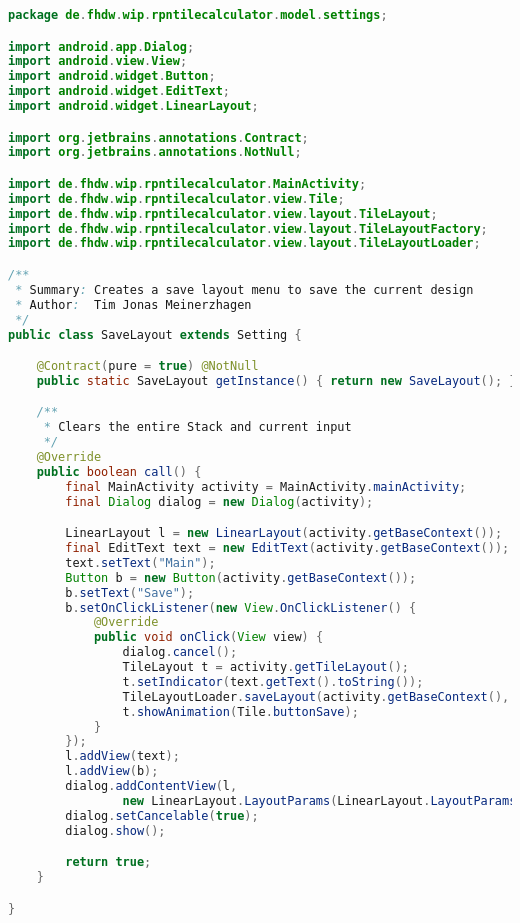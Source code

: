 \begin{lstlisting}[caption=SaveLayout (Meinerzhagen),label=list:SaveLayout,language=Java]
package de.fhdw.wip.rpntilecalculator.model.settings;

import android.app.Dialog;
import android.view.View;
import android.widget.Button;
import android.widget.EditText;
import android.widget.LinearLayout;

import org.jetbrains.annotations.Contract;
import org.jetbrains.annotations.NotNull;

import de.fhdw.wip.rpntilecalculator.MainActivity;
import de.fhdw.wip.rpntilecalculator.view.Tile;
import de.fhdw.wip.rpntilecalculator.view.layout.TileLayout;
import de.fhdw.wip.rpntilecalculator.view.layout.TileLayoutFactory;
import de.fhdw.wip.rpntilecalculator.view.layout.TileLayoutLoader;

/**
 * Summary: Creates a save layout menu to save the current design
 * Author:  Tim Jonas Meinerzhagen
 */
public class SaveLayout extends Setting {

    @Contract(pure = true) @NotNull
    public static SaveLayout getInstance() { return new SaveLayout(); }

    /**
     * Clears the entire Stack and current input
     */
    @Override
    public boolean call() {
        final MainActivity activity = MainActivity.mainActivity;
        final Dialog dialog = new Dialog(activity);

        LinearLayout l = new LinearLayout(activity.getBaseContext());
        final EditText text = new EditText(activity.getBaseContext());
        text.setText("Main");
        Button b = new Button(activity.getBaseContext());
        b.setText("Save");
        b.setOnClickListener(new View.OnClickListener() {
            @Override
            public void onClick(View view) {
                dialog.cancel();
                TileLayout t = activity.getTileLayout();
                t.setIndicator(text.getText().toString());
                TileLayoutLoader.saveLayout(activity.getBaseContext(), t);
                t.showAnimation(Tile.buttonSave);
            }
        });
        l.addView(text);
        l.addView(b);
        dialog.addContentView(l,
                new LinearLayout.LayoutParams(LinearLayout.LayoutParams.WRAP_CONTENT, LinearLayout.LayoutParams.WRAP_CONTENT));
        dialog.setCancelable(true);
        dialog.show();

        return true;
    }

}
\end{lstlisting}    

